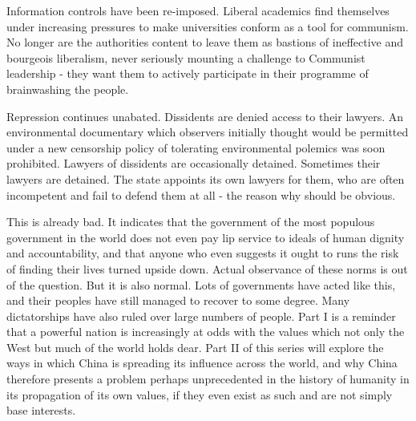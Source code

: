 \documentclass[10pt,a4paper,twocolumn]{article}
\newcounter{count}
\begin{document}
Information controls have been re-imposed. Liberal academics find themselves under increasing pressures to make universities conform as a tool for communism. No longer are the authorities content to leave them as bastions of ineffective and bourgeois liberalism, never seriously mounting a challenge to Communist leadership - they want them to actively participate in their programme of brainwashing the people.

Repression continues unabated. Dissidents are denied access to their lawyers. An environmental documentary which observers initially thought would be permitted under a new censorship policy of tolerating environmental polemics was soon prohibited. Lawyers of dissidents are occasionally detained. Sometimes their lawyers are detained. The state appoints its own lawyers for them, who are often incompetent and fail to defend them at all - the reason why should be obvious.

This is already bad. It indicates that the government of the most populous government in the world does not even pay lip service to ideals of human dignity and accountability, and that anyone who even suggests it ought to runs the risk of finding their lives turned upside down. Actual observance of these norms is out of the question. But it is also normal. Lots of governments have acted like this, and their peoples have still managed to recover to some degree. Many dictatorships have also ruled over large numbers of people. Part I is a reminder that a powerful nation is increasingly at odds with the values which not only the West but much of the world holds dear. Part II of this series will explore the ways in which China is spreading its influence across the world, and why China therefore presents a problem perhaps unprecedented in the history of humanity in its propagation of its own values, if they even exist as such and are not simply base interests.



\end{document}
